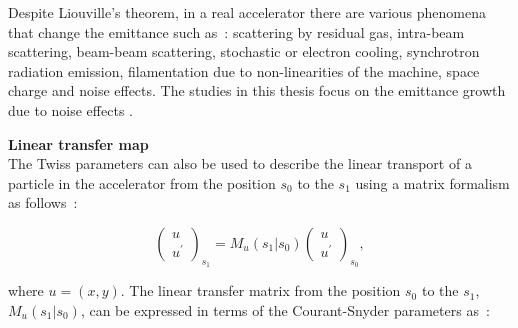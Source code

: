  
 
Despite Liouville's theorem, in a real accelerator there are various phenomena that change the emittance such as~\cite{Buon:216507}: scattering by residual gas, intra-beam scattering, beam-beam scattering, stochastic or electron cooling, synchrotron radiation emission, filamentation due to non-linearities of the machine, space charge and noise effects. The studies in this thesis focus on the emittance growth due to noise effects .
 

\textbf{Linear transfer map}\\
The Twiss parameters can also be used to describe the linear transport of a particle in the accelerator from the position $s_0$ to the $s_1$ using a matrix formalism as follows~\cite{Lee:1425444}: %

\begin{equation}\label{eq:matrix_formalism_intro}
   \begin{pmatrix}
    u\\ 
    u^\prime
    \end{pmatrix}_{s_1} = M_u (s_1 |  s_0) \begin{pmatrix}
    u\\ 
    u^\prime
    \end{pmatrix}_{s_0},
\end{equation}

where $u=(x,y)$. The linear transfer matrix from the position $s_0$ to the $s_1$, $M_u (s_1 | s_0)$, can be expressed in terms of the Courant-Snyder parameters as~\cite{Lee:1425444}: %

